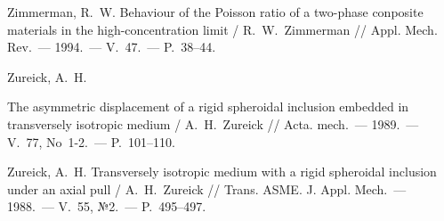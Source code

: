 \begin{russian}
\begin{biblist}{99}
Zimmerman, R.~W. 
Behaviour of the Poisson ratio of a two-phase conposite materials in the high-concentration limit  
/ R.~W.~Zimmerman 
// Appl. Mech. Rev.~--- 1994.~--- V.~47.~--- P.~38--44.

Zureick, A.~H. 

The asymmetric displacement of a rigid spheroidal inclusion embedded in transversely isotropic medium 
/ A.~H.~Zureick 
// Acta. mech.~--- 1989.~--- V.~77, No~1-2.~--- P.~101--110.

Zureick, A.~H. 
Transversely isotropic medium with a rigid spheroidal inclusion under an axial pull 
/ A.~H.~Zureick 
// Trans. ASME. J. Appl. Mech.~--- 1988.~--- V.~55, №2.~--- P.~495--497.

\end{biblist}

\end{russian}